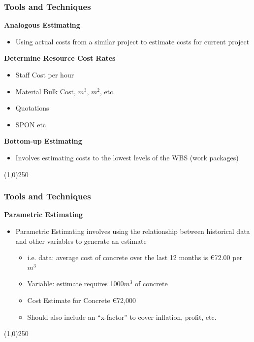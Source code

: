 \begin{frame}
\frametitle{Tools and Techniques}
\textbf{Analogous Estimating}
\begin{itemize}
	\item Using actual costs from a similar project to estimate costs for current project
\end{itemize}
\textbf{Determine Resource Cost Rates}
\begin{itemize}
	\item Staff Cost per hour
	\item Material Bulk Cost, $m^{3}$, $m^{2}$, etc.
	\item Quotations
	\item SPON etc
\end{itemize}
\textbf{Bottom-up Estimating}
\begin{itemize}
	\item Involves estimating costs to the lowest levels of the WBS (work packages)
\end{itemize}
\end{frame}
\begin{center}\line(1,0){250}\end{center}






\begin{frame}
\frametitle{Tools and Techniques}
\textbf{Parametric Estimating}
\begin{itemize}
	\item Parametric Estimating involves using the relationship between historical data and other variables to generate an estimate
	\begin{itemize}
		\item i.e. data: average cost of concrete over the last 12 months is \euro72.00 per $m^{3}$
		\item Variable: estimate requires 1000$m^{3}$ of concrete
		\item Cost Estimate for Concrete \euro72,000
		\item Should also include an ``x-factor'' to cover inflation, profit, etc.
	\end{itemize}
\end{itemize}

\end{frame}
\begin{center}\line(1,0){250}\end{center}



